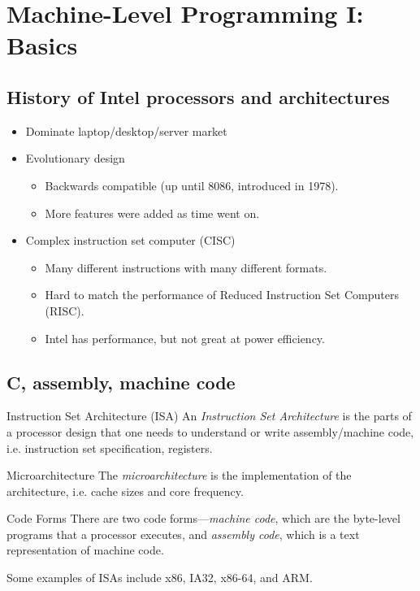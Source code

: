 \documentclass[class=article, crop=false]{standalone}
\begin{document}
  \section{Machine-Level Programming I: Basics}
  \subsection{History of Intel processors and architectures}
  \begin{itemize}
    \item Dominate laptop/desktop/server market
    \item Evolutionary design
    \begin{itemize}
      \item Backwards compatible (up until $8086$, introduced in 1978).
      \item More features were added as time went on.
    \end{itemize}
    \item Complex instruction set computer (CISC)
    \begin{itemize}
      \item Many different instructions with many different formats.
      \item Hard to match the performance of Reduced Instruction Set Computers (RISC).
      \item Intel has performance, but not great at power efficiency.
    \end{itemize}
  \end{itemize}
  \subsection{C, assembly, machine code}
  \begin{definition}{Instruction Set Architecture (ISA)}
    An \emph{Instruction Set Architecture} is the parts of a processor design that one needs to understand or write assembly/machine code, i.e. instruction set specification, registers.
  \end{definition}
  \begin{definition}{Microarchitecture}
    The \emph{microarchitecture} is the implementation of the architecture, i.e. cache sizes and core frequency.
  \end{definition}
  \begin{definition}{Code Forms}
    There are two code forms---\emph{machine code}, which are the byte-level programs that a processor executes, and \emph{assembly code}, which is a text representation of machine code.
  \end{definition}
  Some examples of ISAs include x86, IA32, x86-64, and ARM.
\end{document}
